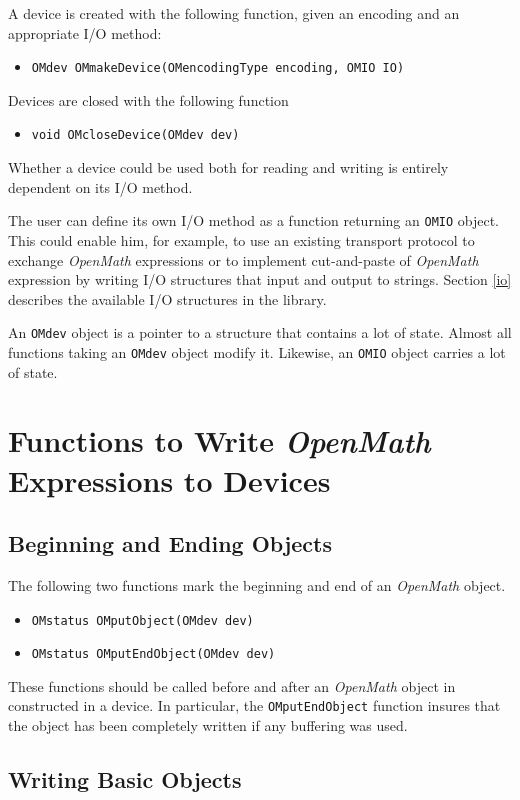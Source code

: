 \documentclass{article}
\newcommand{\OM}{{\sl OpenMath}}
\begin{document}
A device is created with the following function, given an encoding and
an appropriate I/O method:
\begin{itemize} 
\item {\tt OMdev OMmakeDevice(OMencodingType encoding, OMIO IO)}
\end{itemize} 
Devices are closed with the following function
\begin{itemize} 
\item {\tt void OMcloseDevice(OMdev dev)}
\end{itemize} 

Whether a device could be used both for reading and writing is entirely
dependent on its I/O method. 

The user can define its own I/O method as a function returning
an {\tt OMIO} object. This could enable him, for example, to use an
existing transport protocol to exchange {\OM} expressions or to implement
cut-and-paste of {\OM} expression by writing I/O structures that input and
output to strings. Section \ref{io} describes the available I/O structures in
the library.


An {\tt OMdev} object is a pointer to a structure that contains a lot of
state. Almost all functions taking an {\tt OMdev} object modify it. Likewise,
an {\tt OMIO} object carries a lot of state. 


\section{Functions to Write {\OM} Expressions to Devices}

\subsection{Beginning and Ending Objects}

The following two functions mark the beginning and end of an {\OM} object.
\begin{itemize} 
\item \verb+OMstatus OMputObject(OMdev dev)+
\item \verb+OMstatus OMputEndObject(OMdev dev)+
\end{itemize} 
These functions should be called  before and after an {\OM} object in
constructed in a device. 
In particular, the \verb+OMputEndObject+ function insures that the object has
been completely written if any buffering was used.

\subsection{Writing Basic Objects}
\end{document}
